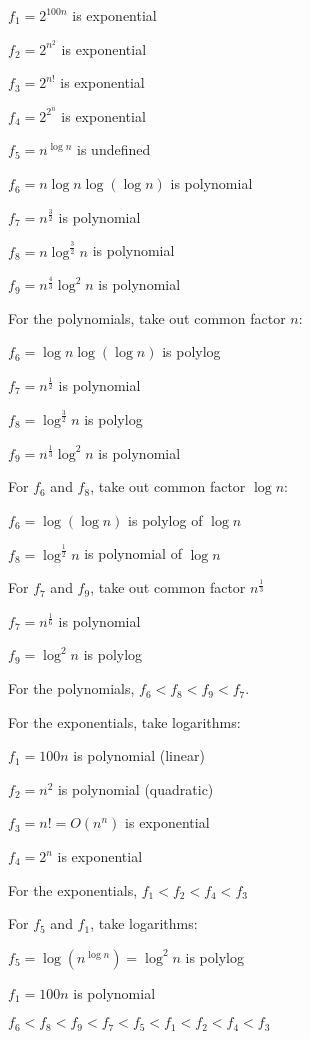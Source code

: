 \begin{ex}
$f_1 = 2^{100n}$ is exponential

$f_2 = 2^{n^2}$ is exponential

$f_3 = 2^{n!}$ is exponential

$f_4 = 2^{2^n}$ is exponential

$f_5 = n^{\log n}$ is undefined

$f_6 = n \log n \log(\log n)$ is polynomial

$f_7 = n^{\tfrac{3}{2}}$ is polynomial

$f_8 = n \log^{\tfrac{3}{2}} n$ is polynomial

$f_9 = n^{\tfrac{4}{3}} \log^2 n$ is polynomial

For the polynomials, take out common factor $n$:

$f_6 = \log n \log(\log n)$ is polylog

$f_7 = n^{\tfrac{1}{2}}$ is polynomial

$f_8 = \log^{\tfrac{3}{2}} n$ is polylog

$f_9 = n^{\tfrac{1}{3}} \log^2 n$ is polynomial

For $f_6$ and $f_8$, take out common factor $\log n$:

$f_6 = \log(\log n)$ is polylog of $\log n$

$f_8 = \log^{\tfrac{1}{2}} n$ is polynomial of $\log n$

For $f_7$ and $f_9$, take out common factor $n^{\tfrac{1}{3}}$

$f_7 = n^{\tfrac{1}{6}}$ is polynomial

$f_9 = \log^2 n$ is polylog

For the polynomials, $f_6 < f_8 < f_9 < f_7$.

For the exponentials, take logarithms:

$f_1 = 100n$ is polynomial (linear)

$f_2 = n^2$ is polynomial (quadratic)

$f_3 = n! = O(n^n)$ is exponential

$f_4 = 2^n$ is exponential

For the exponentials, $f_1 < f_2 < f_4 < f_3$

For $f_5$ and $f_1$, take logarithms:

$f_5 = \log(n^{\log n}) = \log^2 n$ is polylog

$f_1 = 100n$ is polynomial

$f_6 < f_8 < f_9 < f_7 < f_5 < f_1 < f_2 < f_4 < f_3$
\end{ex}

